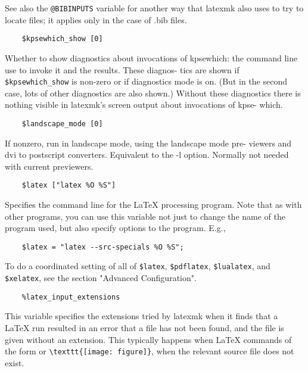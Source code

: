 See  also  the  \verb|@BIBINPUTS| variable for another way that latexmk
also uses to try to locate files; it applies only in the case of
.bib files.

\begin{verbatim}
	$kpsewhich_show [0]
\end{verbatim}

Whether  to show diagnostics about invocations of kpsewhich: the
command line use to invoke it and the results.   These  diagnos-
tics  are shown if \verb|$kpsewhich_show| is non-zero or if diagnostics
mode is on.  (But in the second case, lots of other  diagnostics
are  also  shown.)   Without  these diagnostics there is nothing
visible in latexmk's screen output about  invocations  of  kpse-
which.

\begin{verbatim}
	$landscape_mode [0]
\end{verbatim}

If nonzero, run in landscape mode, using the landscape mode pre-
viewers and dvi to postscript converters.  Equivalent to the  -l
option.  Normally not needed with current previewers.

\begin{verbatim}
	$latex ["latex %O %S"]
\end{verbatim}

Specifies  the  command  line  for the LaTeX processing program.
Note that as with other programs, you can use this variable  not
just  to  change  the name of the program used, but also specify
options to the program.  E.g.,

\begin{verbatim}
	$latex = "latex --src-specials %O %S";
\end{verbatim}

To do a coordinated setting of all of \verb|$latex|, \verb|$pdflatex|,
\verb|$lualatex|, and \verb|$xelatex|, see the section "Advanced
Configuration".


\begin{verbatim}
	%latex_input_extensions
\end{verbatim}

This  variable specifies the extensions tried by latexmk when it
finds that a LaTeX run resulted in an error that a file has  not
been  found,  and  the file is given without an extension.  This
typically happens when LaTeX commands of the  form  \verb||
or  \verb|\texttt{[image: figure]}|, when the relevant source file does
not exist.

